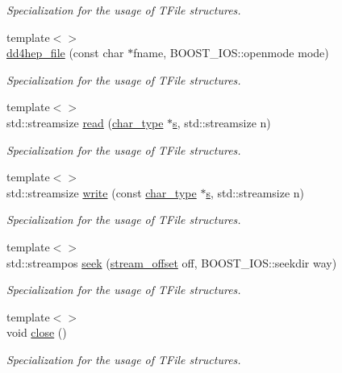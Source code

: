 \begin{DoxyCompactItemize}
\begin{DoxyCompactList}\small\item\em Specialization for the usage of T\+File structures. \end{DoxyCompactList}\item 
{\footnotesize template$<$$>$ }\\\hyperlink{class_d_d4hep_1_1dd4hep__file_aa1f1a5bfdaae699856ca5bf69be37531}{dd4hep\+\_\+file} (const char $\ast$fname, B\+O\+O\+S\+T\+\_\+\+I\+O\+S\+::openmode mode)
\begin{DoxyCompactList}\small\item\em Specialization for the usage of T\+File structures. \end{DoxyCompactList}\item 
{\footnotesize template$<$$>$ }\\std\+::streamsize \hyperlink{class_d_d4hep_1_1dd4hep__file_a215a98857667d16d6def78858cd26e42}{read} (\hyperlink{class_d_d4hep_1_1dd4hep__file_aef4242f7f2fe15a59f7bf7a8f6ba24d5}{char\+\_\+type} $\ast$\hyperlink{_volumes_8cpp_a17ca6bfc8040d695d3cada22a4763d40}{s}, std\+::streamsize n)
\begin{DoxyCompactList}\small\item\em Specialization for the usage of T\+File structures. \end{DoxyCompactList}\item 
{\footnotesize template$<$$>$ }\\std\+::streamsize \hyperlink{class_d_d4hep_1_1dd4hep__file_ab165475b5ef2872deda4b955384063ff}{write} (const \hyperlink{class_d_d4hep_1_1dd4hep__file_aef4242f7f2fe15a59f7bf7a8f6ba24d5}{char\+\_\+type} $\ast$\hyperlink{_volumes_8cpp_a17ca6bfc8040d695d3cada22a4763d40}{s}, std\+::streamsize n)
\begin{DoxyCompactList}\small\item\em Specialization for the usage of T\+File structures. \end{DoxyCompactList}\item 
{\footnotesize template$<$$>$ }\\std\+::streampos \hyperlink{class_d_d4hep_1_1dd4hep__file_a0cdbacb2c6bd80183636a18c711f3c13}{seek} (\hyperlink{class_d_d4hep_1_1dd4hep__file_a28e1531542193871075e8b7f47818113}{stream\+\_\+offset} off, B\+O\+O\+S\+T\+\_\+\+I\+O\+S\+::seekdir way)
\begin{DoxyCompactList}\small\item\em Specialization for the usage of T\+File structures. \end{DoxyCompactList}\item 
{\footnotesize template$<$$>$ }\\void \hyperlink{class_d_d4hep_1_1dd4hep__file_a5f05024772ae9f03845bc14443a99354}{close} ()
\begin{DoxyCompactList}\small\item\em Specialization for the usage of T\+File structures. \end{DoxyCompactList}\end{DoxyCompactItemize}
